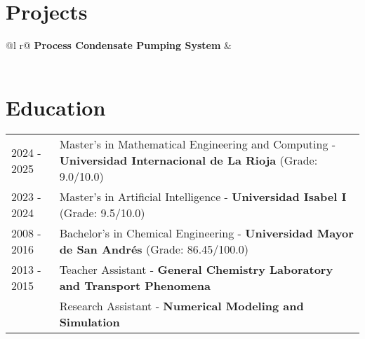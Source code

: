 \documentclass[a4paper,12pt]{article}
\begin{document}
\section{Projects}

\begin{tabularx}{\linewidth}{ @{}l r@{} }
\textbf{Process Condensate Pumping System} & \hfill  \\[3.75pt]
  \\
\end{tabularx}

\section{Education}
\begin{tabularx}{\linewidth}{@{}l X@{}}	
2024 - 2025 & Master’s in Mathematical Engineering and Computing - \textbf{Universidad Internacional de La Rioja} \hfill (Grade: 9.0/10.0)\normalsize  \\

2023 - 2024 & Master’s in Artificial Intelligence - \textbf{Universidad Isabel I} \hfill (Grade: 9.5/10.0) \\ 

2008 - 2016 & Bachelor’s in Chemical Engineering - \textbf{Universidad Mayor de San Andrés} \hfill (Grade: 86.45/100.0) \\ 
2013 - 2015 & Teacher Assistant - \textbf{General Chemistry Laboratory and Transport Phenomena}  \\
& Research Assistant - \textbf{Numerical Modeling and Simulation}  \\

\end{tabularx}
\end{document}
